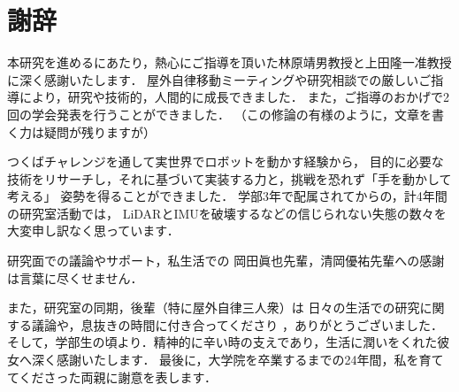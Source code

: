 \chapter*{謝辞}

本研究を進めるにあたり，熱心にご指導を頂いた林原靖男教授と上田隆一准教授に深く感謝いたします．
屋外自律移動ミーティングや研究相談での厳しいご指導により，研究や技術的，人間的に成長できました．
また，ご指導のおかげで2回の学会発表を行うことができました．
（この修論の有様のように，文章を書く力は疑問が残りますが）

つくばチャレンジを通して実世界でロボットを動かす経験から，
目的に必要な技術をリサーチし，それに基づいて実装する力と，挑戦を恐れず「手を動かして考える」
姿勢を得ることができました．
学部3年で配属されてからの，計4年間の研究室活動では，
LiDARとIMUを破壊するなどの信じられない失態の数々を大変申し訳なく思っています．

研究面での議論やサポート，私生活での
岡田眞也先輩，清岡優祐先輩への感謝は言葉に尽くせません．

また，研究室の同期，後輩（特に屋外自律三人衆）は
日々の生活での研究に関する議論や，息抜きの時間に付き合ってくださり
，ありがとうございました．
そして，学部生の頃より．精神的に辛い時の支えであり，生活に潤いをくれた彼女へ深く感謝いたします．
最後に，大学院を卒業するまでの24年間，私を育ててくださった両親に謝意を表します．


